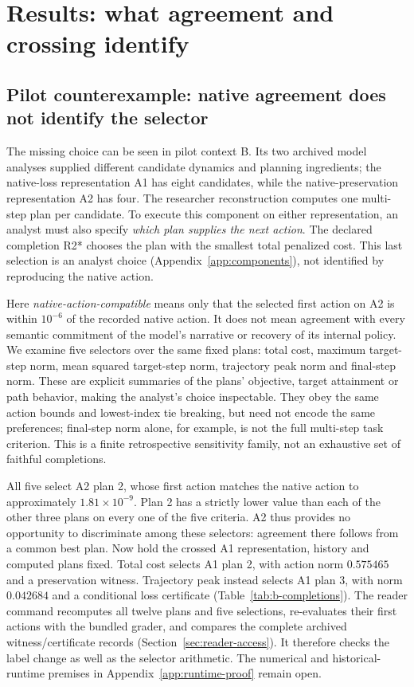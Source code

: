 \section{Results: what agreement and crossing identify}
\subsection{Pilot counterexample: native agreement does not identify the selector}
\label{sec:selector-sensitivity}
The missing choice can be seen in pilot context B. Its two archived model
analyses supplied different candidate dynamics and planning ingredients;
the native-loss representation A1 has eight candidates, while the
native-preservation representation A2 has four. The researcher reconstruction
computes one multi-step plan per candidate. To execute this component on
either representation, an analyst must also specify \emph{which plan supplies
the next action}. The declared completion R2* chooses the plan with the
smallest total penalized cost. This last selection is an analyst choice
(Appendix~\ref{app:components}), not identified by reproducing the native action.

Here \emph{native-action-compatible} means only that the selected first action
on A2 is within $10^{-6}$ of the recorded native action. It does not mean
agreement with every semantic commitment of the model's narrative or recovery
of its internal policy. We examine five selectors over the same fixed plans:
total cost, maximum target-step norm, mean squared target-step norm, trajectory
peak norm and final-step norm. These are explicit summaries of the plans'
objective, target attainment or path behavior, making the analyst's choice
inspectable. They obey the same action bounds and lowest-index tie breaking,
but need not encode the same preferences; final-step norm alone, for example,
is not the full multi-step task criterion. This is a finite retrospective
sensitivity family, not an exhaustive set of faithful completions.



All five select A2 plan 2, whose first action matches the native action to
approximately $1.81\times10^{-9}$. Plan 2 has a strictly lower value than
each of the other three plans on every one of the five criteria. A2 thus
provides no opportunity to discriminate among these selectors: agreement
there follows from a common best plan. Now hold the crossed A1 representation,
history and computed plans fixed. Total cost selects A1 plan 2, with action
norm $0.575465$ and a preservation witness. Trajectory peak instead selects
A1 plan 3, with norm $0.042684$ and a conditional loss certificate
(Table~\ref{tab:b-completions}). The reader command recomputes all twelve plans
and five selections, re-evaluates their first actions with the bundled grader,
and compares the complete archived witness/certificate records
(Section~\ref{sec:reader-access}). It therefore checks the label change as well
as the selector arithmetic. The numerical and historical-runtime premises
in Appendix~\ref{app:runtime-proof} remain open.

